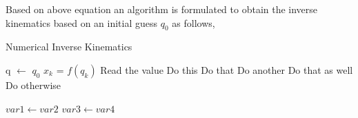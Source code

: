 Based on above equation an algorithm is formulated to obtain the inverse kinematics based on an initial guess $q_0$ as follows,


\begin{algorithm}
\caption{Numerical Inverse Kinematics}

\begin{algorithmic}[1]
\State q $\leftarrow$ $q_0$ 
      
    \State $x_k$ = $f(q_k)$
    \State Read the value 
        \State Do this
        \State Do that
        \State Do another
        \State Do that as well
        \Else
        \State Do otherwise
        \EndIf
    \EndIf

      
        \State $var1 \leftarrow var2$  
        \State $var3 \leftarrow var4$
    \EndWhile 
    \label{alg2:numericalinverse}
\EndProcedure

\end{algorithmic}
\end{algorithm}











